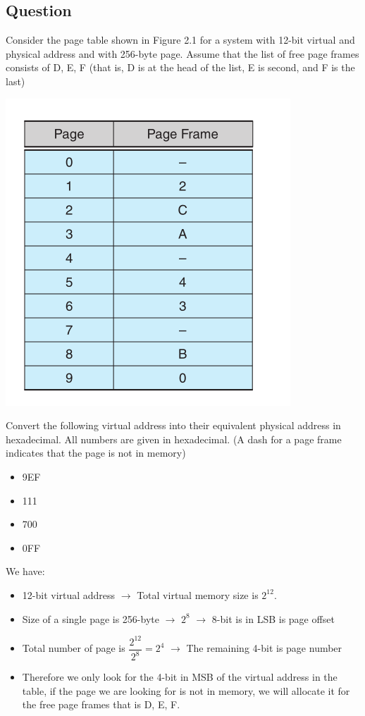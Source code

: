 \documentclass[a4paper, 11pt]{article}
\newcommand{\rarrow}{\rightarrow}
\begin{document}
\subsection{Question}

\par{Consider the page table shown in Figure 2.1 for a system with 12-bit virtual and physical address and with 256-byte page. Assume that the list of free page frames consists of D, E, F (that is, D is at the head of the list, E is second, and F is the last)}

\bigbreak
\includegraphics[scale = 0.7]{Figure.png}
\bigbreak

\par{Convert the following virtual address into their equivalent physical address in hexadecimal. All numbers are given in hexadecimal. (A dash for a page frame indicates that the page is not in memory)}

\begin{itemize}
    \item 9EF
    \item 111
    \item 700
    \item 0FF
\end{itemize}

\par{We have: }

\begin{itemize}
    \item 12-bit virtual address $\rarrow$ Total virtual memory size is $2^{12}$.
    \item Size of a single page is 256-byte $\rarrow$ $2^{8}$ $\rarrow$ 8-bit is in LSB is page offset 
    \item Total number of page is $\dfrac{2^{12}}{2^{8}} = 2^{4}$ $\rarrow$ The remaining 4-bit is page number 
    \item Therefore we only look for the 4-bit in MSB of the virtual address in the table, if the page we are looking for is not in memory, we will allocate it for the free page frames that is D, E, F.
\end{itemize}
\end{document}
